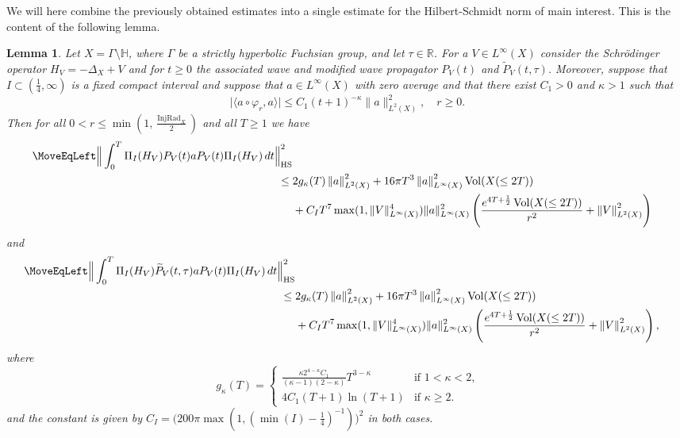 \documentclass[11pt,twoside,reqno]{amsart}
\newcommand{\R}{\mathbb{R}}
\newcommand{\bH}{\mathbb{H}}
\renewcommand{\phi}{\varphi}
\newcommand{\1}{\mathrm{\mathbf{1}}}
\newcommand{\bHS}{\mathrm{HS}}
\DeclareMathOperator{\Vol}{Vol}
\DeclareMathOperator{\vol}{Vol}
\DeclareMathOperator{\InjRad}{InjRad}
\newcommand{\norm}[1]{\left\lVert#1\right\rVert}
\numberwithin{equation}{section}
\theoremstyle{plain}
\newtheorem{lemma}[thm]{Lemma}
\theoremstyle{definition}
\theoremstyle{remark}
\begin{document}
We will here combine the previously obtained estimates into a single estimate for the Hilbert-Schmidt norm of main interest. This is the content of the following lemma. 

\begin{lemma}\label{LE:Main_HS_est}
Let $X=\Gamma\setminus \bH$, where $\Gamma$ be a strictly hyperbolic Fuchsian group, and let $\tau\in\R$. 
For a $V\in L^\infty(X)$ consider the Schr\"odinger operator $H_V = -\Delta_X + V$ and for $t\geq 0$ the associated wave and modified wave propagator $P_V(t)$ and $\widetilde{P}_V(t,\tau)$. Moreover, suppose that $I\subset (\frac{1}{4},\infty)$ is a fixed compact interval and suppose that $a\in L^\infty(X)$ with zero average and that there exist $C_1>0$ and $\kappa>1$ such that  
\begin{equation*}
  \big|\langle a \circ \phi_r, a \rangle \big| \leq C_1 (t+1)^{-\kappa} \lVert a \rVert_{L^2(X)}^2,\quad r \geq 0.  
\end{equation*}
Then for all $0<r\leq \min(1, \frac{\InjRad_X}{2})$ and all $T\geq1$ we have
\begin{equation}
    \begin{aligned}
       \MoveEqLeft \Big\lVert \int_0^T \Pi_I(H_V) P_V(t) a P_V(t) \Pi_I(H_V) \, d t \Big\rVert_{\bHS}^2 
       \\
       \leq{}&2g_\kappa(T) \norm{a}^2_{L^2(X)}+  16\pi T^3 \norm{a}_{L^\infty(X)}^2 \vol(X(\leq 2T))
       \\
       &+ C_I T^7  \max(1, \lVert V\rVert_{L^\infty(X)}^4)  \lVert a \rVert^2_{L^\infty(X)}\left( \frac{  e^{4T+\frac12} \Vol(X(\leq2T))}{r^2} + \norm{V}_{L^2(X)}^2 \right)
        \end{aligned}
    \end{equation}
    and 
    \begin{equation}
    \begin{aligned}
       \MoveEqLeft \Big\lVert \int_0^T \Pi_I(H_V) \widetilde{P}_V(t,\tau) a P_V(t) \Pi_I(H_V) \, d t \Big\rVert_{\bHS}^2 
       \\
       \leq{}& 2g_\kappa(T) \norm{a}^2_{L^2(X)}+  16\pi T^3 \norm{a}_{L^\infty(X)}^2 \vol(X(\leq 2T))
       \\
       &+ C_I T^7  \max(1, \lVert V\rVert_{L^\infty(X)}^4)  \lVert a \rVert^2_{L^\infty(X)}\left( \frac{  e^{4T+\frac12} \Vol(X(\leq2T))}{r^2} + \norm{V}_{L^2(X)}^2 \right),
        \end{aligned}
    \end{equation}
where
\begin{equation*}
    g_\kappa(T) = \begin{cases}
        \frac{\kappa 2^{4-\kappa} C_1}{(\kappa -1)(2-\kappa)} T^{3-\kappa} & \text{if $1<\kappa<2$,}\\
        4 C_1(T+1)\ln (T+1) & \text{if $\kappa\geq 2$.}
    \end{cases}        
\end{equation*}
 and the constant is given by $C_{I}=\big(200 \pi \max(1,(\min(I)-\frac14)^{-1})\big)^2$ in both cases.
\end{lemma}
\end{document}
